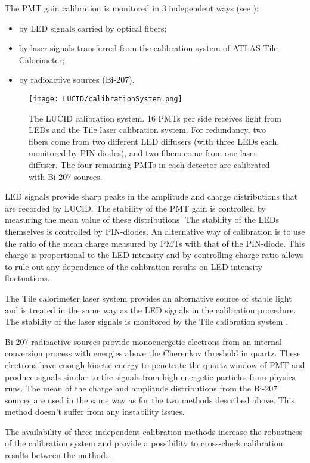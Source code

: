 The PMT gain calibration is monitored in 3 independent ways (see ):
\begin{itemize}
 \item by LED signals carried by optical fibers;
 \item by laser signals transferred from the calibration system of ATLAS Tile Calorimeter;
 \item by radioactive sources (Bi-207).
\end{itemize}

\begin{figure}
\centering
\texttt{[image: LUCID/calibrationSystem.png]}
\caption{The LUCID calibration system. 16 PMTs per side receives light from LEDs and the Tile laser calibration 
system. 
For redundancy, two fibers come from two different LED diffusers (with three LEDs each, monitored by 
PIN-diodes), and two fibers come from one laser diffuser. The four remaining PMTs in each detector are calibrated 
with Bi-207 sources.}
\label{fig:calibrationSystem}
\end{figure}

LED signals provide sharp peaks in the amplitude and charge distributions that are recorded by LUCID.
The stability of the PMT gain is controlled by measuring the mean value of these distributions. 
The stability of the LEDs themselves is controlled by PIN-diodes.
An alternative way of calibration is to use the ratio of the mean charge measured by PMTs with that of the 
PIN-diode. 
This charge is proportional to the LED intensity and by controlling charge ratio allows to rule out any 
dependence of the calibration results on LED intensity fluctuations.

The Tile calorimeter laser system provides an alternative source of stable light and is treated in the same way
as the LED signals in the calibration 
procedure. The stability of the laser signals is monitored by the Tile calibration system \cite{atlasGeneral}.

Bi-207 radioactive sources provide monoenergetic electrons from an internal conversion process with energies 
above the Cherenkov threshold in quartz. These electrons
have enough kinetic energy to penetrate the quartz window of PMT and produce signals similar to the signals 
from high 
energetic particles from physics runs. The mean of the charge and amplitude 
distributions from the Bi-207 sources are used in the same way as for the two methods described above. 
This method doesn't suffer from any instability issues.

The availability of three independent calibration methods increase the robustness of the calibration system 
and provide a possibility to cross-check calibration results between the methods.